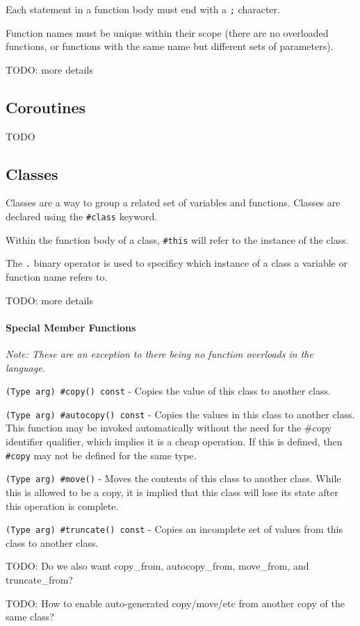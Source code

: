 \documentclass{article}
\newcommand{\code}[1]{\colorbox{light-gray}{\texttt{#1}}}
\newcommand{\breakingparagraph}[1]{\paragraph{#1}\mbox{}\medbreak}
\begin{document}
Each statement in a function body must end with a \code{;} character.

Function names must be unique within their scope (there are no overloaded functions, or functions with the same name but different sets of parameters).

TODO: more details

\subsection{Coroutines}

TODO

\subsection{Classes}

Classes are a way to group a related set of variables and functions.  Classes are declared using the \code{\#class} keyword.

Within the function body of a class, \code{\#this} will refer to the instance of the class.

The \code{.} binary operator is used to specificy which instance of a class a variable or function name refers to.

TODO: more details

\breakingparagraph{Special Member Functions}

\textit{Note: These are an exception to there being no function overloads in the language.}

\code{(Type arg) \#copy() const} - Copies the value of this class to another class.

\code{(Type arg) \#autocopy() const} - Copies the values in this class to another class.  This function may be invoked automatically without the need for the \#copy identifier qualifier, which implies it is a cheap operation.  If this is defined, then \code{\#copy} may not be defined for the same type.

\code{(Type arg) \#move()} - Moves the contents of this class to another class.  While this is allowed to be a copy, it is implied that this class will lose its state after this operation is complete.

\code{(Type arg) \#truncate() const} - Copies an incomplete set of values from this class to another class.

TODO: Do we also want copy_from, autocopy_from, move_from, and truncate_from?

TODO: How to enable auto-generated copy/move/etc from another copy of the same class?
\end{document}
